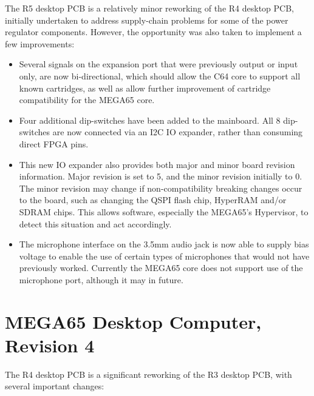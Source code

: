 The R5 desktop PCB is a relatively minor reworking of the R4 desktop PCB, initially undertaken to address supply-chain problems for some of the power regulator components. However, the opportunity was also taken to implement a few improvements:

\begin{itemize}
\item Several signals on the expansion port that were previously output or input only, are now bi-directional, which should allow the C64 core to support all known cartridges, as well as allow further improvement of cartridge compatibility for the MEGA65 core.
\item Four additional dip-switches have been added to the mainboard. All 8 dip-switches are now connected via an I2C IO expander, rather than consuming direct FPGA pins.
\item This new IO expander also provides both major and minor board revision information. Major revision is set to 5, and the minor revision initially to 0. The minor revision may change if non-compatibility breaking changes occur to the board, such as changing the QSPI flash chip, HyperRAM and/or SDRAM chips. This allows software, especially the MEGA65's Hypervisor, to detect this situation and act accordingly.
\item The microphone interface on the 3.5mm audio jack is now able to supply bias voltage to enable the use of certain types of microphones that would not have previously worked.  Currently the MEGA65 core does not support use of the microphone port, although it may in future.

\end{itemize}

\section{MEGA65 Desktop Computer, Revision 4}

The R4 desktop PCB is a significant reworking of the R3 desktop PCB, with several important changes:

